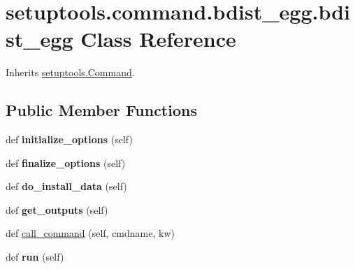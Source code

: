 \hypertarget{classsetuptools_1_1command_1_1bdist__egg_1_1bdist__egg}{}\section{setuptools.\+command.\+bdist\+\_\+egg.\+bdist\+\_\+egg Class Reference}
\label{classsetuptools_1_1command_1_1bdist__egg_1_1bdist__egg}


Inherits \hyperlink{classsetuptools_1_1_command}{setuptools.\+Command}.

\subsection*{Public Member Functions}
\begin{DoxyCompactItemize}
\item 
\mbox{\label{classsetuptools_1_1command_1_1bdist__egg_1_1bdist__egg_a5e0bf3917774256abc0c560b0aa60666}} 
def {\bfseries initialize\+\_\+options} (self)
\item 
\mbox{\label{classsetuptools_1_1command_1_1bdist__egg_1_1bdist__egg_a2df3e0eea55a526265f27e5e3450a7c9}} 
def {\bfseries finalize\+\_\+options} (self)
\item 
\mbox{\label{classsetuptools_1_1command_1_1bdist__egg_1_1bdist__egg_a7e5c3429cd7af6d1666efa7d302a99a9}} 
def {\bfseries do\+\_\+install\+\_\+data} (self)
\item 
\mbox{\label{classsetuptools_1_1command_1_1bdist__egg_1_1bdist__egg_a803f6680a62a646555384fc3ae06747d}} 
def {\bfseries get\+\_\+outputs} (self)
\item 
def \hyperlink{classsetuptools_1_1command_1_1bdist__egg_1_1bdist__egg_a2e5aad64f49a4cd20330927ede1cf93f}{call\+\_\+command} (self, cmdname, kw)
\item 
\mbox{\label{classsetuptools_1_1command_1_1bdist__egg_1_1bdist__egg_aba0d75c484a4998875ab89bf5b351703}} 
def {\bfseries run} (self)
\item 

\end{DoxyCompactItemize}
